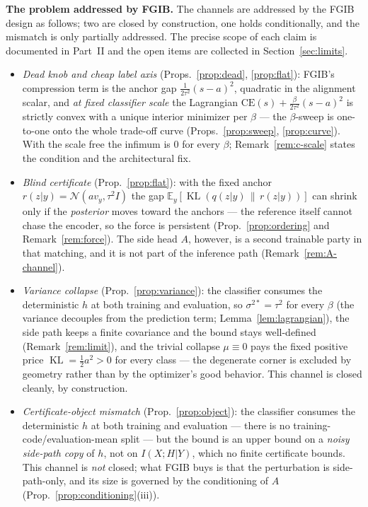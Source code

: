 \textbf{The problem addressed by FGIB.}
The channels are addressed by the FGIB design as follows; two are closed by
construction, one holds conditionally, and the mismatch is only partially addressed. The precise
scope of each claim is documented in Part~II and the open items are collected in
Section~\ref{sec:limits}.
\begin{itemize}
\item \emph{Dead knob and cheap label axis} (Props.~\ref{prop:dead}, \ref{prop:flat}):
FGIB's compression term is the anchor gap $\tfrac{1}{2\tau^2}(s-a)^2$, quadratic in the
alignment scalar, and \emph{at fixed classifier scale} the Lagrangian
$\mathrm{CE}(s) + \tfrac{\beta}{2\tau^2}(s-a)^2$ is strictly convex with a unique interior
minimizer per $\beta$ --- the $\beta$-sweep is one-to-one onto the whole trade-off curve
(Props.~\ref{prop:sweep}, \ref{prop:curve}). With the scale free the infimum is $0$ for
every $\beta$; Remark~\ref{rem:c-scale} states the condition and the architectural fix.
\item \emph{Blind certificate} (Prop.~\ref{prop:flat}): with the fixed anchor
$r(z|y) = \mathcal{N}(a v_y, \tau^2 I)$ the gap
$\mathbb{E}_y[\operatorname{KL}(q(z|y)\,\|\,r(z|y))]$ can shrink only if the
\emph{posterior} moves toward the anchors --- the reference itself cannot chase the
encoder, so the force is persistent (Prop.~\ref{prop:ordering} and
Remark~\ref{rem:force}). The side head $A$, however, is a second trainable party in that
matching, and it is not part of the inference path
(Remark~\ref{rem:A-channel}).
\item \emph{Variance collapse} (Prop.~\ref{prop:variance}): the classifier consumes the
deterministic $h$ at both training and evaluation, so $\sigma^{2*} = \tau^2$ for every $\beta$
(the variance decouples from the prediction term; Lemma~\ref{lem:lagrangian}), the
side path keeps a finite covariance and the bound stays well-defined
(Remark~\ref{rem:limit}), and the trivial collapse $\mu \equiv 0$ pays
the fixed positive price $\operatorname{KL} = \tfrac12 a^2 > 0$ for every class --- the
degenerate corner is excluded by geometry rather than by the optimizer's good behavior.
This channel is closed cleanly, by construction.
\item \emph{Certificate-object mismatch} (Prop.~\ref{prop:object}): the classifier
consumes the deterministic $h$ at both training and evaluation --- there is no
training-code/evaluation-mean split --- but the bound is an upper bound on a
\emph{noisy side-path copy} of $h$, not on $I(X;H|Y)$, which no finite certificate
bounds. This channel is \emph{not} closed; what FGIB buys is that the perturbation is
side-path-only, and its size is governed by the conditioning of $A$
(Prop.~\ref{prop:conditioning}(iii)).
\end{itemize}

